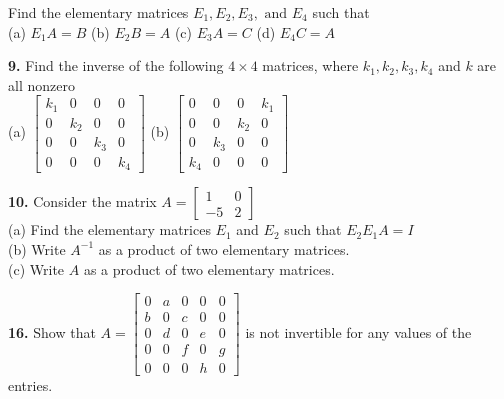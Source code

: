 \documentclass[addpoints]{exam}
\begin{document}
\begin{questions}
    Find the elementary matrices $ E_1, E_2, E_3, \text{ and } E_4 $ such that \\ 
    (a) $ E_1A = B $ \hspace{5mm} (b) $ E_2B = A $ \hspace{5mm} (c) $ E_3A = C $ \hspace{5mm} (d) $ E_4C = A $
    \begin{solution}
        
    \end{solution}

    \textbf{9. } Find the inverse of the following $ 4 \times 4 $ matrices, where $ k_1, k_2, k_3, k_4 $ and $k$ are all nonzero \\ 
    (a) $ \begin{bmatrix}
        k_1 & 0 & 0 & 0 \\ 0 & k_2 & 0 & 0 \\ 0 & 0 & k_3 & 0 \\ 0 & 0 & 0 & k_4
    \end{bmatrix} $ \hspace{5mm} (b) $ \begin{bmatrix}
        0 & 0 & 0 & k_1 \\ 0 & 0 & k_2 & 0 \\ 0 & k_3 & 0 & 0 \\ k_4 & 0 & 0 & 0
    \end{bmatrix} $
    \begin{solution}
        
    \end{solution}

    \textbf{10.} Consider the matrix $ A = \begin{bmatrix}
        1 & 0 \\ -5 & 2
    \end{bmatrix} $ \\ 
    (a) Find the elementary matrices $ E_1 $ and $ E_2 $ such that $ E_2E_1A = I $ \\ 
    (b) Write $ A^{-1} $ as a product of two elementary matrices. \\ 
    (c) Write $A$ as a product of two elementary matrices.
    \begin{solution}
        
    \end{solution}

    \textbf{16. } Show that $ A = \begin{bmatrix}
        0 & a & 0 & 0 & 0 \\ b & 0 & c & 0 & 0 \\ 0 & d & 0 & e & 0 \\ 0 & 0 & f & 0 & g \\ 0 & 0 & 0 & h & 0
    \end{bmatrix} $ is not invertible for any values of the entries. 
    

\end{questions}
\end{document}
